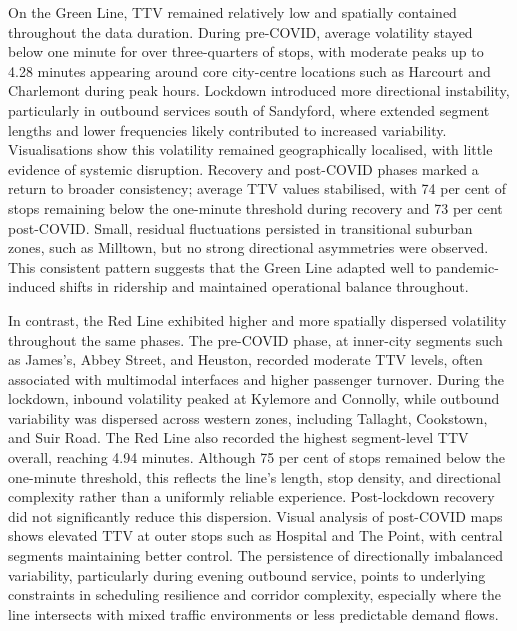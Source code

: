     On the Green Line, TTV remained relatively low and spatially contained throughout the data duration. During pre-COVID, average volatility stayed below one minute for over three-quarters of stops, with moderate peaks up to 4.28 minutes appearing around core city-centre locations such as Harcourt and Charlemont during peak hours. Lockdown introduced more directional instability, particularly in outbound services south of Sandyford, where extended segment lengths and lower frequencies likely contributed to increased variability. Visualisations show this volatility remained geographically localised, with little evidence of systemic disruption. Recovery and post-COVID phases marked a return to broader consistency; average TTV values stabilised, with 74 per cent of stops remaining below the one-minute threshold during recovery and 73 per cent post-COVID. Small, residual fluctuations persisted in transitional suburban zones, such as Milltown, but no strong directional asymmetries were observed. This consistent pattern suggests that the Green Line adapted well to pandemic-induced shifts in ridership and maintained operational balance throughout.

    In contrast, the Red Line exhibited higher and more spatially dispersed volatility throughout the same phases. The pre-COVID phase, at inner-city segments such as James’s, Abbey Street, and Heuston, recorded moderate TTV levels, often associated with multimodal interfaces and higher passenger turnover. During the lockdown, inbound volatility peaked at Kylemore and Connolly, while outbound variability was dispersed across western zones, including Tallaght, Cookstown, and Suir Road. The Red Line also recorded the highest segment-level TTV overall, reaching 4.94 minutes. Although 75 per cent of stops remained below the one-minute threshold, this reflects the line’s length, stop density, and directional complexity rather than a uniformly reliable experience. Post-lockdown recovery did not significantly reduce this dispersion. Visual analysis of post-COVID maps shows elevated TTV at outer stops such as Hospital and The Point, with central segments maintaining better control. The persistence of directionally imbalanced variability, particularly during evening outbound service, points to underlying constraints in scheduling resilience and corridor complexity, especially where the line intersects with mixed traffic environments or less predictable demand flows.

